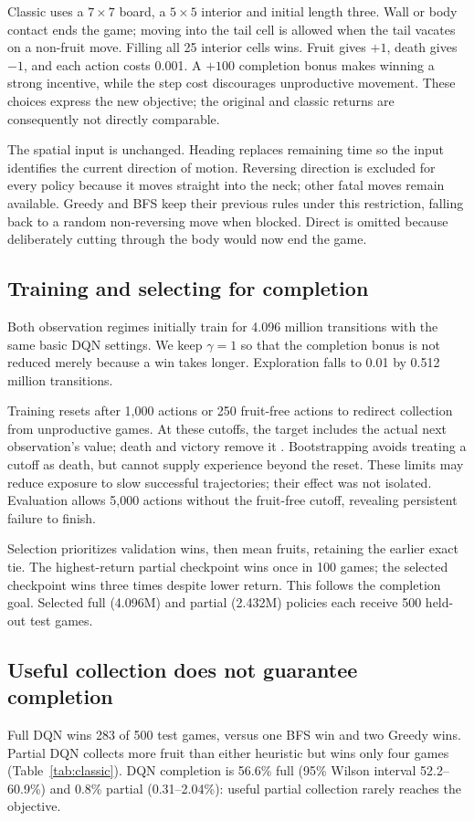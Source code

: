 \documentclass{article}
\begin{document}
Classic uses a $7\times7$ board, a $5\times5$ interior and initial length three. Wall or body contact ends the game; moving into the tail cell is allowed when the tail vacates on a non-fruit move. Filling all 25 interior cells wins. Fruit gives $+1$, death gives $-1$, and each action costs 0.001. A $+100$ completion bonus makes winning a strong incentive, while the step cost discourages unproductive movement. These choices express the new objective; the original and classic returns are consequently not directly comparable.

The spatial input is unchanged. Heading replaces remaining time so the input identifies the current direction of motion. Reversing direction is excluded for every policy because it moves straight into the neck; other fatal moves remain available. Greedy and BFS keep their previous rules under this restriction, falling back to a random non-reversing move when blocked. Direct is omitted because deliberately cutting through the body would now end the game.

\newpage
\subsection{Training and selecting for completion}
Both observation regimes initially train for 4.096 million transitions with the same basic DQN settings. We keep $\gamma=1$ so that the completion bonus is not reduced merely because a win takes longer. Exploration falls to 0.01 by 0.512 million transitions.

Training resets after 1,000 actions or 250 fruit-free actions to redirect collection from unproductive games. At these cutoffs, the target includes the actual next observation's value; death and victory remove it \citep[Sec.~3]{pardo2018timelimits}. Bootstrapping avoids treating a cutoff as death, but cannot supply experience beyond the reset. These limits may reduce exposure to slow successful trajectories; their effect was not isolated. Evaluation allows 5,000 actions without the fruit-free cutoff, revealing persistent failure to finish.

Selection prioritizes validation wins, then mean fruits, retaining the earlier exact tie. The highest-return partial checkpoint wins once in 100 games; the selected checkpoint wins three times despite lower return. This follows the completion goal. Selected full (4.096M) and partial (2.432M) policies each receive 500 held-out test games.

\newpage
\begin{samepage}
\subsection{Useful collection does not guarantee completion}
Full DQN wins 283 of 500 test games, versus one BFS win and two Greedy wins. Partial DQN collects more fruit than either heuristic but wins only four games (Table~\ref{tab:classic}). DQN completion is 56.6\% full (95\% Wilson interval 52.2--60.9\%) and 0.8\% partial (0.31--2.04\%): useful partial collection rarely reaches the objective.\par
\end{samepage}
\end{document}
